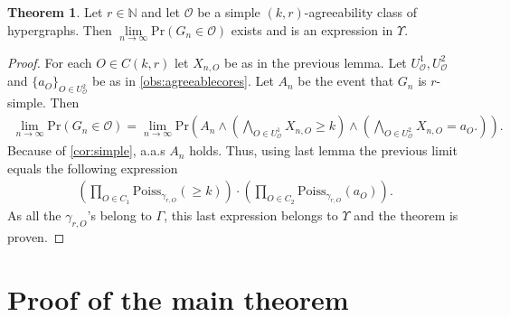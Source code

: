 \documentclass[12pt,notitlepage,a4paper]{article}
\theoremstyle{definition}
\newtheorem{theorem}{Theorem}[section]
\newcommand{\N}{\mathbb{N}}
\newcommand{\Ln}{\lim\limits_{n\to \infty}}
\newcommand{\PR}[1]{\mathrm{Pr}\left(#1\right)}
\begin{document}
\begin{theorem}\label{thm:agreeabilityprobabilities}
	Let $r\in \N$ and let $\mathcal{O}$ be a simple $(k,r)$-agreeability class
	of hypergraphs. Then 
	$\Ln \PR{G_n\in \mathcal{O}}$ exists and is an expression
	in $\Upsilon$. 
\end{theorem}
\begin{proof}
For each $O\in C(k,r)$ let $X_{n,O}$ be as in the previous lemma. 
Let $U_\mathcal{O}^1, U_\mathcal{O}^2$ and $\{a_O\}_{O\in U^2_\mathcal{O}}$ 
be as in \cref{obs:agreeablecores}. Let $A_n$ be the event that $G_n$ is $r$-simple. 
Then
\begin{align*}
 \Ln
 \PR{G_n \in \mathcal{O}}=
 \Ln
 \mathrm{Pr} \left(
 A_n \wedge
 \left(
 \bigwedge_{O\in U_\mathcal{O}^1}
 X_{n,O}\geq k
 \right)
 \wedge
 \left(
 \bigwedge_{O\in  U^2_\mathcal{O}}
 X_{n,O}=a_O.
 \right)
 \right).
\end{align*}
Because of \cref{cor:simple}, a.a.s $A_n$ holds. Thus, using last
lemma the previous limit equals the following expression
\begin{align*}
\left(
\prod_{O\in C_1}
\mathrm{Poiss}_{\gamma_{r,O}}(\geq k)
\right)
\cdot
\left(
\prod_{O\in C_2}
\mathrm{Poiss}_{\gamma_{r,O}}(a_O)
\right)
.
\end{align*}
As all the $\gamma_{r,O}$'s belong to $\Gamma$,
this last expression belongs to $\Upsilon$ and the theorem is proven. 
\end{proof}

\section{Proof of the main theorem} \label{sect:main}
\end{document}
